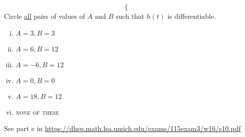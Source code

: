 \documentclass[11pt]{exam}
\begin{document}
\begin{questions}
\[\begin{cases}
\end{cases}
\]
Circle \underline{all} pairs of values of $A$ and $B$ such that $h(t)$ is differentiable.
\begin{multicols}{3}
    \begin{enumerate}[i.]
        \item $A = 3, B = 3$
        \item $A = 6, B = 12	$
        \item $A = -6, B = 12$
        \item $A = 0, B = 0$
        \item $A = 18, B = 12$
        \item \textsc{none of these}
    \end{enumerate}
\end{multicols}
\begin{solution}
  See part e in \href{https://dhsp.math.lsa.umich.edu/exams/115exam3/w16/s10.pdf}{https://dhsp.math.lsa.umich.edu/exams/115exam3/w16/s10.pdf}
\end{solution}
\end{questions}
\end{document}
